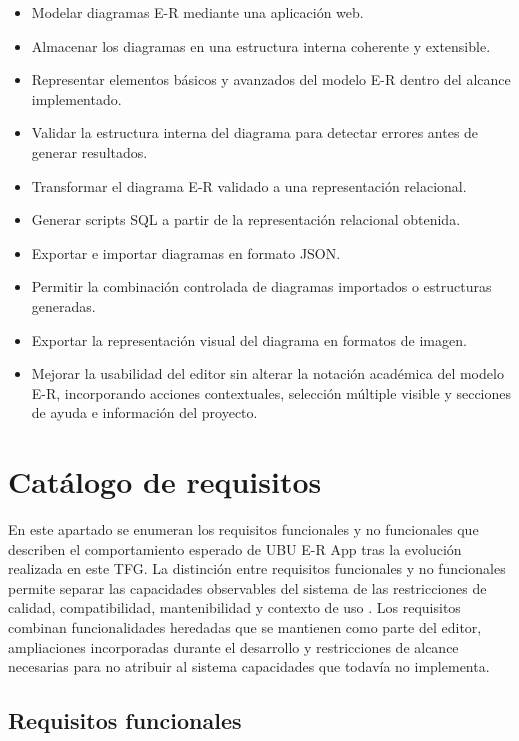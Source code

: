 \begin{itemize}
\tightlist
\item Modelar diagramas E-R mediante una aplicación web.
\item Almacenar los diagramas en una estructura interna coherente y extensible.
\item Representar elementos básicos y avanzados del modelo E-R dentro del alcance implementado.
\item Validar la estructura interna del diagrama para detectar errores antes de generar resultados.
\item Transformar el diagrama E-R validado a una representación relacional.
\item Generar scripts SQL a partir de la representación relacional obtenida.
\item Exportar e importar diagramas en formato JSON.
\item Permitir la combinación controlada de diagramas importados o estructuras generadas.
\item Exportar la representación visual del diagrama en formatos de imagen.
\item Mejorar la usabilidad del editor sin alterar la notación académica del modelo E-R, incorporando acciones contextuales, selección múltiple visible y secciones de ayuda e información del proyecto.
\end{itemize}

\section{Catálogo de requisitos}

En este apartado se enumeran los requisitos funcionales y no funcionales que describen el comportamiento esperado de UBU E-R App tras la evolución realizada en este TFG. La distinción entre requisitos funcionales y no funcionales permite separar las capacidades observables del sistema de las restricciones de calidad, compatibilidad, mantenibilidad y contexto de uso \cite{iso29148}. Los requisitos combinan funcionalidades heredadas que se mantienen como parte del editor, ampliaciones incorporadas durante el desarrollo y restricciones de alcance necesarias para no atribuir al sistema capacidades que todavía no implementa.

\subsection{Requisitos funcionales}

